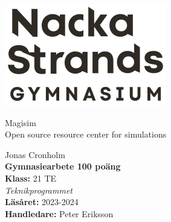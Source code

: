 \documentclass[11pt, a4paper, titlepage]{article}
\begin{document}
\begin{titlepage}
	\noindent
	\includegraphics[width=0.15\paperwidth]{logo-mg.png} %
	
	\vspace*{0.5\paperwidth} %
	\noindent\hspace*{0.15\paperwidth} %
	\begin{minipage}{\textwidth}
		
		\color[HTML]{0b5394}\Huge Magisim\\
		\color{black}\Large Open source resource center for simulations \\
	\end{minipage}
	
	\vfill %
	\noindent
	\begin{minipage}{\textwidth}
		\normalsize %
		Jonas Cronholm \\
		\textbf{Gymnasiearbete 100 poäng} \\
		\textbf{Klass:} 21 TE \\
		\textit{Teknikprogrammet} \\
		\textbf{Läsåret:} 2023-2024 \\
		\textbf{Handledare:} Peter Eriksson
	\end{minipage}
\end{titlepage}

% 
%
\end{document}
